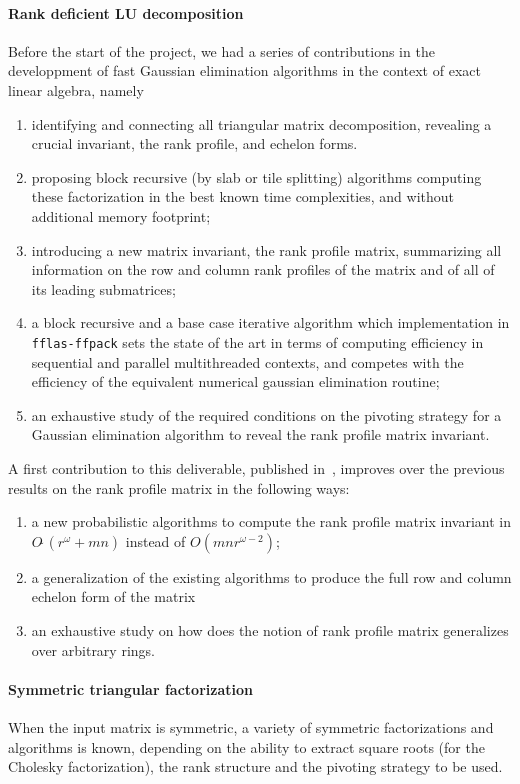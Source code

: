 \documentclass{deliverablereport}
\begin{document}
\paragraph{Rank deficient LU decomposition} Before the start of the project, we had a series of contributions in the
developpment of fast Gaussian elimination algorithms in the context of exact
linear algebra, namely
\begin{enumerate}
\item identifying and connecting all triangular matrix decomposition, revealing
  a crucial invariant, the rank profile, and echelon forms.
\item proposing block recursive (by slab or tile splitting) algorithms computing
  these factorization in the best known time complexities, and without
  additional memory footprint;
\item introducing a new matrix invariant, the rank profile matrix, summarizing
  all information on the row and column rank profiles of the matrix and of all
  of its leading submatrices;
\item a block recursive and a base case iterative algorithm which implementation
  in \texttt{fflas-ffpack} sets the state of the art in terms of computing
  efficiency in sequential and parallel multithreaded contexts, and competes
  with the efficiency of the equivalent numerical gaussian elimination routine;
\item an exhaustive study of the required
conditions on the pivoting strategy for a Gaussian elimination algorithm to
reveal the rank profile matrix invariant.

\end{enumerate}
A first contribution to this deliverable, published in~\cite{DPS17},
improves over the previous results on the rank profile matrix in the following
ways:
\begin{enumerate}
\item a new probabilistic algorithms to compute the rank profile matrix
  invariant in  $O\tilde\ (r^\omega + mn)$ instead of $O(mnr^{\omega-2})$;
\item a generalization of the existing algorithms to produce the full row and
  column echelon form of the matrix
\item an exhaustive study on how does the notion of rank profile matrix
  generalizes over arbitrary rings.
\end{enumerate}


\paragraph{Symmetric triangular factorization}
When the input matrix is symmetric, a variety of symmetric factorizations and
algorithms is known, depending on the ability to extract
square roots (for the Cholesky factorization), the rank structure and the
pivoting strategy to be used.
\end{document}
